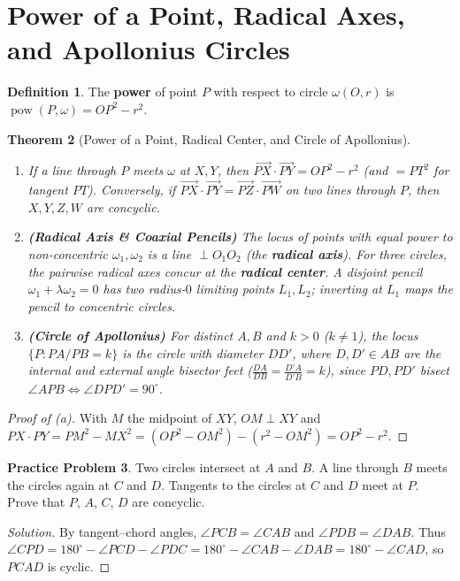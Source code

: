 \documentclass[11pt]{article}
\theoremstyle{plain}
\newtheorem{theorem}{Theorem}[section]
\theoremstyle{definition}
\newtheorem{definition}[theorem]{Definition}
\newtheorem{problem}[theorem]{Practice Problem}
\newenvironment{solution}{\begin{proof}[Solution]}{\end{proof}}
\newcommand{\pow}{\operatorname{pow}}
\begin{document}
\section{Power of a Point, Radical Axes, and Apollonius Circles}

\begin{definition}
The \textbf{power} of point $P$ with respect to circle $\omega(O,r)$ is $\pow(P,\omega) = OP^2 - r^2$.
\end{definition}

\begin{theorem}[Power of a Point, Radical Center, and Circle of Apollonius]
\leavevmode
\begin{enumerate}[label=(\alph*)]
\item If a line through $P$ meets $\omega$ at $X, Y$, then $\overrightarrow{PX}\cdot\overrightarrow{PY} = OP^2 - r^2$ (and $= PT^2$ for tangent $PT$). Conversely, if $\overrightarrow{PX}\cdot\overrightarrow{PY} = \overrightarrow{PZ}\cdot\overrightarrow{PW}$ on two lines through $P$, then $X,Y,Z,W$ are concyclic.
\item \textbf{(Radical Axis \& Coaxial Pencils)} The locus of points with equal power to non-concentric $\omega_1, \omega_2$ is a line $\perp O_1O_2$ (the \textbf{radical axis}). For three circles, the pairwise radical axes concur at the \textbf{radical center}. A disjoint pencil $\omega_1 + \lambda\omega_2 = 0$ has two radius-$0$ limiting points $L_1, L_2$; inverting at $L_1$ maps the pencil to concentric circles.
\item \textbf{(Circle of Apollonius)} For distinct $A, B$ and $k > 0$ ($k \ne 1$), the locus $\{P : PA/PB = k\}$ is the circle with diameter $DD'$, where $D, D' \in AB$ are the internal and external angle bisector feet ($\frac{DA}{DB} = \frac{D'A}{D'B} = k$), since $PD, PD'$ bisect $\angle APB \iff \angle DPD' = 90^\circ$.
\end{enumerate}
\end{theorem}
\begin{proof}[Proof of (a)]
With $M$ the midpoint of $XY$, $OM \perp XY$ and $PX\cdot PY = PM^2 - MX^2 = (OP^2 - OM^2) - (r^2 - OM^2) = OP^2 - r^2$.
\end{proof}

\begin{problem}
Two circles intersect at $A$ and $B$. A line through $B$ meets the circles
again at $C$ and $D$. Tangents to the circles at $C$ and $D$ meet at $P$.
Prove that $P$, $A$, $C$, $D$ are concyclic.
\end{problem}
\begin{solution}
By tangent--chord angles, $\angle PCB = \angle CAB$ and $\angle PDB = \angle DAB$. Thus
$\angle CPD = 180^\circ - \angle PCD - \angle PDC = 180^\circ - \angle CAB - \angle DAB = 180^\circ - \angle CAD$,
so $PCAD$ is cyclic.
\end{solution}
\end{document}
